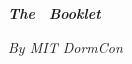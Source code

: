 \documentclass{book}
\begin{document}
    \pagestyle{empty}
    \vspace*{180pt}
    {\Huge \textbf{\textit{The \eventtitle~Booklet}}}

    \vspace*{36pt}

    {\huge \textit{By MIT DormCon}}

    \eventdescription
    \clearpage

    \pagestyle{fancy}
    
\end{document}
